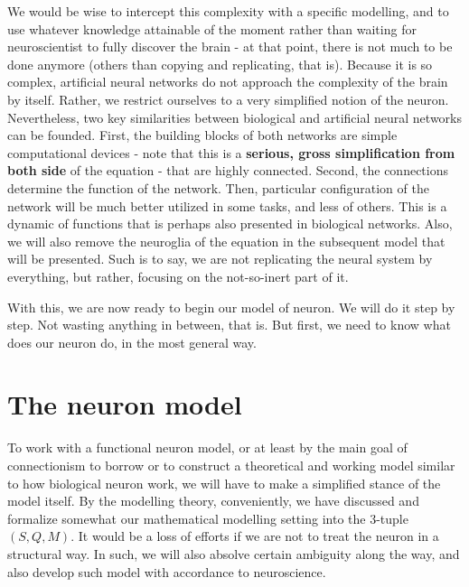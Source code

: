 We would be wise to intercept this complexity with a specific modelling, and to use whatever knowledge attainable of the moment rather than waiting for neuroscientist to fully discover the brain - at that point, there is not much to be done anymore (others than copying and replicating, that is). Because it is so complex, artificial neural networks do not approach the complexity of the brain by itself. Rather, we restrict ourselves to a very simplified notion of the neuron. Nevertheless, two key similarities between biological and artificial neural networks can be founded. First, the building blocks of both networks are simple computational devices - note that this is a \textbf{serious, gross simplification from both side} of the equation - that are highly connected. Second, the connections determine the function of the network. Then, particular configuration of the network will be much better utilized in some tasks, and less of others. This is a dynamic of functions that is perhaps also presented in biological networks. Also, we will also remove the neuroglia of the equation in the subsequent model that will be presented. Such is to say, we are not replicating the neural system by everything, but rather, focusing on the not-so-inert part of it.

With this, we are now ready to begin our model of neuron. We will do it step by step. Not wasting anything in between, that is. But first, we need to know what does our neuron do, in the most general way. 

\section{The neuron model}


To work with a functional neuron model, or at least by the main goal of connectionism to borrow or to construct a theoretical and working model similar to how biological neuron work, we will have to make a simplified stance of the model itself. By the modelling theory, conveniently, we have discussed and formalize somewhat our mathematical modelling setting into the 3-tuple $(S,Q,M)$. It would be a loss of efforts if we are not to treat the neuron in a structural way. In such, we will also absolve certain ambiguity along the way, and also develop such model with accordance to neuroscience.   

